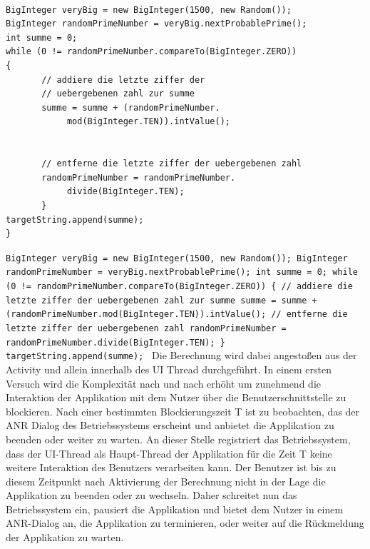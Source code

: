 \documentclass[12pt,oneside,a4paper,bibtotoc,liststotoc]{scrreprt}
\begin{document}
\begin{lstlisting}

BigInteger veryBig = new BigInteger(1500, new Random());
BigInteger randomPrimeNumber = veryBig.nextProbablePrime();
int summe = 0;
while (0 != randomPrimeNumber.compareTo(BigInteger.ZERO)) 
{ 
       // addiere die letzte ziffer der 
       // uebergebenen zahl zur summe 
       summe = summe + (randomPrimeNumber.
			mod(BigInteger.TEN)).intValue(); 
       					
       				
       // entferne die letzte ziffer der uebergebenen zahl 
       randomPrimeNumber = randomPrimeNumber.
       		divide(BigInteger.TEN); 
       } 
targetString.append(summe);
}
\end{lstlisting}

\texttt{BigInteger veryBig = new BigInteger(1500, new Random());\newline
BigInteger randomPrimeNumber = veryBig.nextProbablePrime();\newline
int summe = 0;\newline\newline
while (0 != randomPrimeNumber.compareTo(BigInteger.ZERO))\newline 
\{ \newline
       // addiere die letzte ziffer der uebergebenen zahl zur summe \newline
       summe = summe + (randomPrimeNumber.mod(BigInteger.TEN)).intValue(); \newline\newline\newline
       // entferne die letzte ziffer der uebergebenen zahl \newline
       randomPrimeNumber = randomPrimeNumber.divide(BigInteger.TEN); \newline
       \} \newline
targetString.append(summe);\newline
}\newline
Die Berechnung wird dabei angestoßen aus der Activity und allein innerhalb des UI Thread durchgeführt. In einem ersten Versuch wird die Komplexität nach und nach erhöht um zunehmend die Interaktion der Applikation mit dem Nutzer über die Benutzerschnittstelle zu blockieren. Nach einer bestimmten Blockierungszeit T ist zu beobachten, das der ANR Dialog des Betriebssystems erscheint und anbietet die Applikation zu beenden oder weiter zu warten. An dieser Stelle registriert das Betriebssystem, dass der UI-Thread als Haupt-Thread der Applikation für die Zeit T keine weitere Interaktion des Benutzers verarbeiten kann. Der Benutzer ist bis zu diesem Zeitpunkt nach Aktivierung der Berechnung nicht in der Lage die Applikation zu beenden oder zu wechseln. Daher schreitet nun das Betriebssystem ein, pausiert die Applikation und bietet dem Nutzer in einem ANR-Dialog an, die Applikation zu terminieren, oder weiter auf die Rückmeldung der Applikation zu warten.
\end{document}
